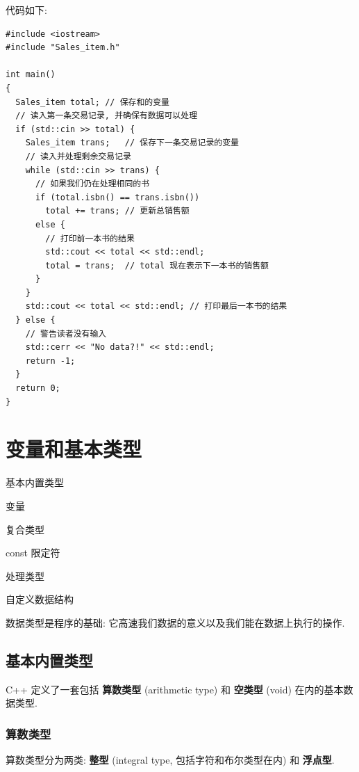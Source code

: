 \documentclass[lang=cn]{elegantbook}
\begin{document}
代码如下:

\begin{verbatim}
#include <iostream>
#include "Sales_item.h"

int main()
{
  Sales_item total; // 保存和的变量
  // 读入第一条交易记录, 并确保有数据可以处理
  if (std::cin >> total) {
    Sales_item trans;   // 保存下一条交易记录的变量
    // 读入并处理剩余交易记录
    while (std::cin >> trans) {
      // 如果我们仍在处理相同的书
      if (total.isbn() == trans.isbn())
        total += trans; // 更新总销售额
      else {
        // 打印前一本书的结果
        std::cout << total << std::endl;
        total = trans;  // total 现在表示下一本书的销售额
      }
    }
    std::cout << total << std::endl; // 打印最后一本书的结果
  } else {
    // 警告读者没有输入
    std::cerr << "No data?!" << std::endl;
    return -1;
  }
  return 0;
}
\end{verbatim}


\chapter{变量和基本类型}
\label{sec:org90a8957}

\begin{introduction}
  \item 基本内置类型
  \item 变量
  \item 复合类型
  \item const 限定符
  \item 处理类型
  \item 自定义数据结构
\end{introduction}


数据类型是程序的基础: 它高速我们数据的意义以及我们能在数据上执行的操作.

\section{基本内置类型}
\label{sec:org9471bdc}

C++ 定义了一套包括 \textbf{算数类型} (arithmetic type) 和 \textbf{空类型} (void) 在内的基本数
据类型.

\subsection{算数类型}
\label{sec:orgd72e142}

算数类型分为两类: \textbf{整型} (integral type, 包括字符和布尔类型在内) 和 \textbf{浮点型}.
\end{document}
